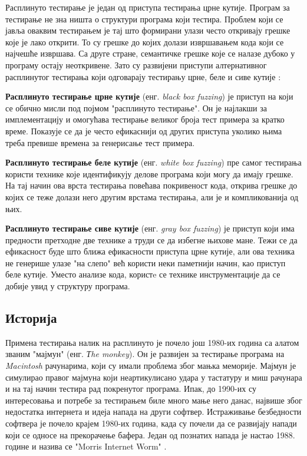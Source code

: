 \documentclass[12pt,oneside]{memoir}
\begin{document}
Расплинуто тестирање је један од приступа тестирања црне кутије. Програм за тестирање не зна ништа о структури програма који тестира. Проблем који се јавља оваквим тестирањем је тај што формирани улази често откривају грешке које је лако открити. То су грешке до којих долази извршавањем кода који се најчешће извршава. Са друге стране, семантичке грешке које се налазе дубоко у програму остају неоткривене. Зато су развијени приступи алтернативног расплинутог тестирања који одговарају тестирању црне, беле и сиве кутије \cite{fuzzing, grayBoxFuzzing, whiteBoxFuzzing}:
\begin{description}
\item\textbf{Расплинуто тестирање црне кутије} (енг. \textit{black box fuzzing}) је приступ на који се обично мисли под појмом "расплинуто тестирање". Он је најлакши за имплементацију и омогућава тестирање великог броја тест примера за кратко време. Показује се да је често ефикаснији од других приступа уколико њима треба превише времена за генерисање тест примера.
\item\textbf{Расплинуто тестирање беле кутије} (енг. \textit{white box fuzzing}) пре самог тестирања користи технике које идентификују делове програма који могу да имају грешке. На тај начин ова врста тестирања повећава покривеност кода, открива грешке до којих се теже долази него другим врстама тестирања, али је и компликованија од њих. 
\item\textbf{Расплинуто тестирање сиве кутије} (енг. \textit{gray box fuzzing}) је приступ који има предности претходне две технике а труди се да избегне њихове мане. Тежи се да ефикасност буде што ближа ефикасности приступа црне кутије, али ова техника не генерише улазе "на слепо" већ користи неки паметнији начин, као приступ беле кутије. Уместо анализе кода, користe се технике инструментације да се добије увид у структуру програма.
\end{description}

\subsection{Историја}
\label{subsec:history}

Примена тестирања налик на расплинуто је почело још 1980-их година са алатом званим "мајмун" (енг. \textit{Тhe monkey}). Он је развијен за тестирање програма на \textit{Macintosh} рачунарима, који су имали проблема због мањка меморије. Мајмун је симулирао правог мајмуна који неартикулисано удара у тастатуру и миш рачунара и на тај начин тестира рад покренутог програма. Ипак, до 1990-их су интересовања и потребе за тестирањем биле много мање него данас, највише због недостатка интернета и идеја напада на други софтвер. Истраживање безбедности софтвера је почело крајем 1980-их година, када су почели да се развијају напади који се односе на прекорачење бафера. Један од познатих напада је настао 1988. године и назива се "Morris Internet Worm" \cite{fuzzingBrute, fuzzing}. 
\end{document}
